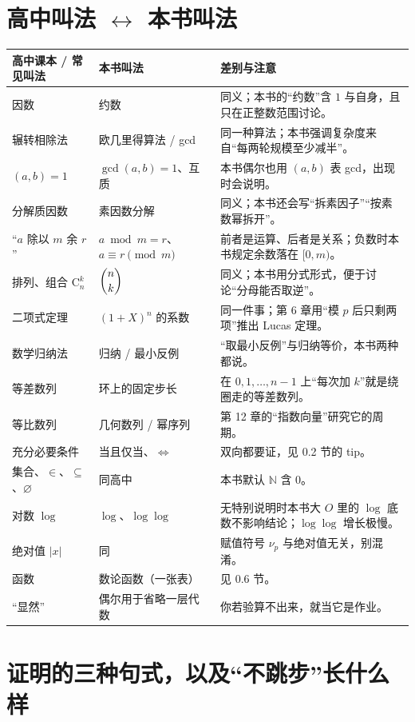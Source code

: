\documentclass[UTF8,a4paper,11pt,twoside,openright,fontset=fandol]{ctexbook}
\theoremstyle{definition}
\newcommand{\N}{\mathbb N}
\begin{document}
\section{高中叫法 $\leftrightarrow$ 本书叫法}
\begin{longtable}{>{\raggedright\arraybackslash}p{}>{\raggedright\arraybackslash}p{}>{\raggedright\arraybackslash}p{}}
\toprule
高中课本 / 常见叫法 & 本书叫法 & 差别与注意\\\midrule
因数 & 约数 & 同义；本书的“约数”含 $1$ 与自身，且只在正整数范围讨论。\\
辗转相除法 & 欧几里得算法 / gcd & 同一种算法；本书强调复杂度来自“每两轮规模至少减半”。\\
$(a,b)=1$ & $\gcd(a,b)=1$、互质 & 本书偶尔也用 $(a,b)$ 表 gcd，出现时会说明。\\
分解质因数 & 素因数分解 & 同义；本书还会写“拆素因子”“按素数幂拆开”。\\
“$a$ 除以 $m$ 余 $r$” & $a\bmod m=r$、$a\equiv r\pmod m$ & 前者是运算、后者是关系；负数时本书规定余数落在 $[0,m)$。\\
排列、组合 $\mathrm{C}_n^k$ & $\dbinom{n}{k}$ & 同义；本书用分式形式，便于讨论“分母能否取逆”。\\
二项式定理 & $(1+X)^n$ 的系数 & 同一件事；第 6 章用“模 $p$ 后只剩两项”推出 Lucas 定理。\\
数学归纳法 & 归纳 / 最小反例 & “取最小反例”与归纳等价，本书两种都说。\\
等差数列 & 环上的固定步长 & 在 $0,1,\ldots,n-1$ 上“每次加 $k$”就是绕圈走的等差数列。\\
等比数列 & 几何数列 / 幂序列 & 第 12 章的“指数向量”研究它的周期。\\
充分必要条件 & 当且仅当、$\iff$ & 双向都要证，见 0.2 节的 tip。\\
集合、$\in$、$\subseteq$、$\varnothing$ & 同高中 & 本书默认 $\N$ 含 $0$。\\
对数 $\log$ & $\log$、$\log\log$ & 无特别说明时本书大 $O$ 里的 $\log$ 底数不影响结论；$\log\log$ 增长极慢。\\
绝对值 $|x|$ & 同 & 赋值符号 $\nu_p$ 与绝对值无关，别混淆。\\
函数 & 数论函数（一张表） & 见 0.6 节。\\
“显然” & 偶尔用于省略一层代数 & 你若验算不出来，就当它是作业。\\
\bottomrule
\end{longtable}

\section{证明的三种句式，以及“不跳步”长什么样}
\end{document}
